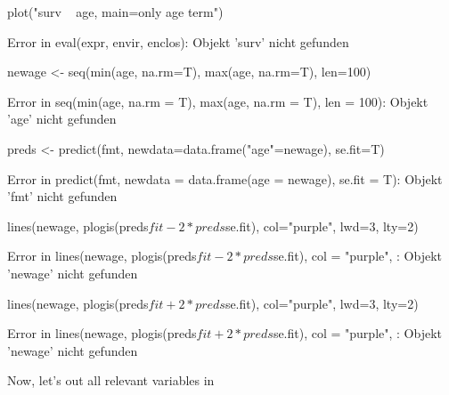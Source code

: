 \documentclass[a4paper,twoside]{tufte-book}\usepackage[]{graphicx}\usepackage[]{color}
\begin{document}
\begin{appendices}
\begin{Schunk}
\begin{Sinput}
plot("surv ~ age, main=only age term")
\end{Sinput}
\begin{Soutput}
Error in eval(expr, envir, enclos): Objekt 'surv' nicht gefunden
\end{Soutput}
\begin{Sinput}
newage <- seq(min(age, na.rm=T), max(age, na.rm=T), len=100)
\end{Sinput}
\begin{Soutput}
Error in seq(min(age, na.rm = T), max(age, na.rm = T), len = 100): Objekt 'age' nicht gefunden
\end{Soutput}
\begin{Sinput}
preds <- predict(fmt, newdata=data.frame("age"=newage), se.fit=T)
\end{Sinput}
\begin{Soutput}
Error in predict(fmt, newdata = data.frame(age = newage), se.fit = T): Objekt 'fmt' nicht gefunden
\end{Soutput}
\begin{Sinput}
lines(newage, plogis(preds$fit-2*preds$se.fit), col="purple", lwd=3, lty=2)
\end{Sinput}
\begin{Soutput}
Error in lines(newage, plogis(preds$fit - 2 * preds$se.fit), col = "purple", : Objekt 'newage' nicht gefunden
\end{Soutput}
\begin{Sinput}
lines(newage, plogis(preds$fit+2*preds$se.fit), col="purple", lwd=3, lty=2)
\end{Sinput}
\begin{Soutput}
Error in lines(newage, plogis(preds$fit + 2 * preds$se.fit), col = "purple", : Objekt 'newage' nicht gefunden
\end{Soutput}
\end{Schunk}

Now, let's out all relevant variables in 


\end{appendices}
\end{document}
